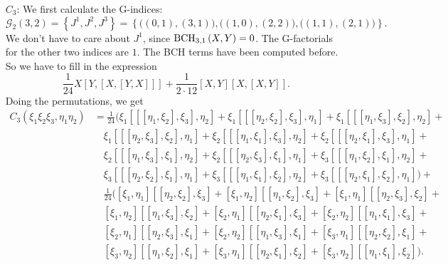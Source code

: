 \begin{itemize}
	\item[$C_3$:]
	We first calculate the G-indices:
	\begin{equation*}
		\mathcal{G}_2(3,2) 
		= 
		\left\{
			J^1, J^2, J^3
		\right\}
		=
		\left\{ 
			\big( (0,1), (3,1) \big), 
			\big( (1,0), (2,2) \big), 
			\big( (1,1), (2,1) \big) 
		\right\}.
	\end{equation*}
	We don't have to care about $J^1$, since $\mathrm{BCH}_{3, 1}\left(X, Y\right) = 0$. The 
	G-factorials for the other two indices are $1$. The BCH terms have been 
	computed before. So we have to fill in the expression
	\begin{equation*}
		\frac{1}{24} X [Y, [X, [Y, X]]] +
		\frac{1}{2 \cdot 12} [X, Y] [X, [X, Y]].
	\end{equation*}
	Doing the permutations, we get
	\begin{align*}
		C_3(\xi_1 \xi_2 \xi_3, \eta_1 \eta_2)
		& =
		\frac{1}{24}
		\big( 
			\xi_1[[[\eta_1, \xi_2], \xi_3], \eta_2] + 
			\xi_1[[[\eta_2, \xi_2], \xi_3], \eta_1] + 
			\xi_1[[[\eta_1, \xi_3], \xi_2], \eta_2] +
		\\
		& \quad
			\xi_1[[[\eta_2, \xi_3], \xi_2], \eta_1] + 
			\xi_2[[[\eta_1, \xi_1], \xi_3], \eta_2] + 
			\xi_2[[[\eta_2, \xi_1], \xi_3], \eta_1] +
		\\
		& \quad
			\xi_2[[[\eta_1, \xi_3], \xi_1], \eta_2] + 
			\xi_2[[[\eta_2, \xi_3], \xi_1], \eta_1] + 
			\xi_3[[[\eta_1, \xi_2], \xi_1], \eta_2] +
		\\
		& \quad
			\xi_3[[[\eta_2, \xi_2], \xi_1], \eta_1] + 
			\xi_3[[[\eta_1, \xi_1], \xi_2], \eta_2] + 
			\xi_3[[[\eta_2, \xi_1], \xi_2], \eta_1]
		\big) +
		\\
		& \quad
		\frac{1}{24}
		\big( 
			[\xi_1, \eta_1][[\eta_2, \xi_2], \xi_3] + 
			[\xi_1, \eta_2][[\eta_1, \xi_2], \xi_3] + 
			[\xi_1, \eta_1][[\eta_2, \xi_3], \xi_2] +
		\\
		& \quad
			[\xi_1, \eta_2][[\eta_1, \xi_3], \xi_2] + 
			[\xi_2, \eta_1][[\eta_2, \xi_1], \xi_3] + 
			[\xi_2, \eta_2][[\eta_1, \xi_1], \xi_3] +
		\\
		& \quad
			[\xi_2, \eta_1][[\eta_2, \xi_3], \xi_1] + 
			[\xi_2, \eta_2][[\eta_1, \xi_3], \xi_1] + 
			[\xi_3, \eta_1][[\eta_2, \xi_2], \xi_1] +
		\\
		& \quad
			[\xi_3, \eta_2][[\eta_1, \xi_2], \xi_1] + 
			[\xi_3, \eta_1][[\eta_2, \xi_1], \xi_2] + 
			[\xi_3, \eta_2][[\eta_1, \xi_1], \xi_2] 
		\big).
	\end{align*}


\end{itemize}
